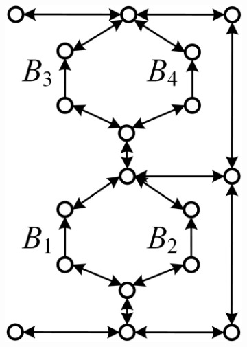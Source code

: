 \documentclass{article}
\begin{document}
\begin{figure}[htbp]
\begin{subfigure}[b]{0.23\textwidth}
        \includegraphics[width=\textwidth]{../attachments/direct-graph-xu.png}
        \caption{}
        \label{fig:direct-graph-xu}
    \end{subfigure}
    \hspace{0.02\textwidth}
    \begin{subfigure}[b]{0.24\textwidth}

\end{subfigure}
\end{figure}
\end{document}

